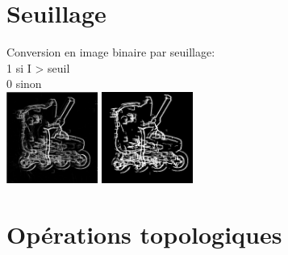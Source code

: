 \documentclass[french]{beamer}
\begin{document}
\section{Seuillage}

\begin{frame}
	Conversion en image binaire par seuillage:\\
	1 si I > seuil\\
	0 sinon\\
	\bigskip
	\includegraphics[width=3cm]{images/roller_res.jpg} \; \includegraphics[width=3cm]{images/roller_bin.jpg}
\end{frame}

\section{Opérations topologiques}
\end{document}

